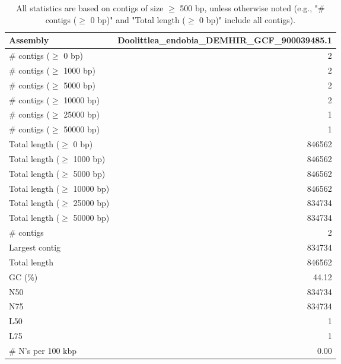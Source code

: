 \documentclass[12pt,a4paper]{article}
\begin{document}
\begin{table}[ht]
\begin{center}
\caption{All statistics are based on contigs of size $\geq$ 500 bp, unless otherwise noted (e.g., "\# contigs ($\geq$ 0 bp)" and "Total length ($\geq$ 0 bp)" include all contigs).}
\begin{tabular}{|l*{1}{|r}|}
\hline
Assembly & Doolittlea\_endobia\_DEMHIR\_GCF\_900039485.1 \\ \hline
\# contigs ($\geq$ 0 bp) & 2 \\ \hline
\# contigs ($\geq$ 1000 bp) & 2 \\ \hline
\# contigs ($\geq$ 5000 bp) & 2 \\ \hline
\# contigs ($\geq$ 10000 bp) & 2 \\ \hline
\# contigs ($\geq$ 25000 bp) & 1 \\ \hline
\# contigs ($\geq$ 50000 bp) & 1 \\ \hline
Total length ($\geq$ 0 bp) & 846562 \\ \hline
Total length ($\geq$ 1000 bp) & 846562 \\ \hline
Total length ($\geq$ 5000 bp) & 846562 \\ \hline
Total length ($\geq$ 10000 bp) & 846562 \\ \hline
Total length ($\geq$ 25000 bp) & 834734 \\ \hline
Total length ($\geq$ 50000 bp) & 834734 \\ \hline
\# contigs & 2 \\ \hline
Largest contig & 834734 \\ \hline
Total length & 846562 \\ \hline
GC (\%) & 44.12 \\ \hline
N50 & 834734 \\ \hline
N75 & 834734 \\ \hline
L50 & 1 \\ \hline
L75 & 1 \\ \hline
\# N's per 100 kbp & 0.00 \\ \hline
\end{tabular}
\end{center}
\end{table}
\end{document}
